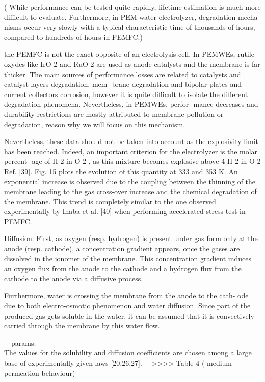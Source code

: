 \documentclass[onecolumn,10pt,titlepage]{article}
\begin{document}
( While performance can be tested quite rapidly,
lifetime estimation is much more difficult to evaluate.
Furthermore, in PEM water electrolyzer, degradation mecha-
nisms occur very slowly with a typical characteristic time of
thousands of hours, compared to hundreds of hours in PEMFC.)

the PEMFC is not the exact opposite of
an electrolysis cell. In PEMWEs, rutile oxydes like IrO 2 and
RuO 2 are used as anode catalysts and the membrane is far
thicker.
The main sources of performance losses are
related to catalysts and catalyst layers degradation, mem-
brane degradation and bipolar plates and current collectors
corrosion, however it is quite difficult to isolate the different
degradation phenomena. Nevertheless, in PEMWEs, perfor-
mance decreases and durability restrictions are mostly
attributed to membrane pollution or degradation, reason why
we will focus on this mechanism.

Nevertheless, these data should not be taken into
account as the explosivity limit has been reached. Indeed, an
important criterion for the electrolyzer is the molar percent-
age of H 2 in O 2 , as this mixture becomes explosive above 4%
H 2 in O 2 Ref. [39]. Fig. 15 plots the evolution of this quantity at
333 and 353 K. An exponential increase is observed due to the
coupling between the thinning of the membrane leading to
the gas cross-over increase and the chemical degradation of
the membrane. This trend is completely similar to the one
observed experimentally by Inaba et al. [40] when performing
accelerated stress test in PEMFC.

Diffusion:
First, as oxygen (resp. hydrogen) is present under gas form
only at the anode (resp. cathode), a concentration gradient
appears, once the gases are dissolved in the ionomer of the
membrane. This concentration gradient induces an oxygen
flux from the anode to the cathode and a hydrogen flux from
the cathode to the anode via a diffusive process.

Furthermore,
water is crossing the membrane from the anode to the cath-
ode due to both electro-osmotic phenomenon and water
diffusion. Since part of the produced gas gets soluble in the
water, it can be assumed that it is convectively carried
through the membrane by this water flow.

---params:\\
The values for the solubility and diffusion coefficients are
chosen among a large base of experimentally given laws
[20,26,27].
--->>>> Table 4 ( medium permeation behaviour)
-----\\
\end{document}
